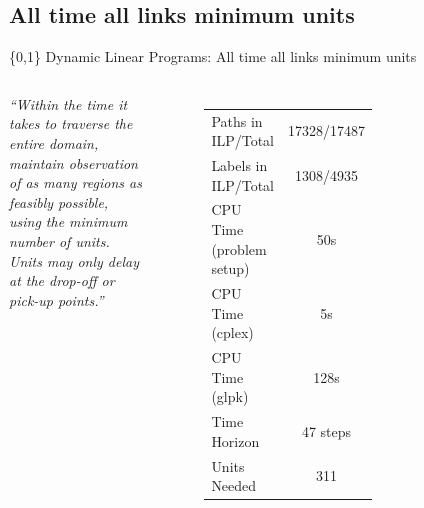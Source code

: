 \documentclass[xcolor=pdflatex,dvipsnames,table]{beamer}
\begin{document}
\subsection{All time all links minimum units}
\begin{frame}{\{0,1\} Dynamic Linear Programs: All time all links minimum units}
\begin{columns}

  \emph{``Within the time it takes to traverse the entire domain, maintain observation of as many regions as feasibly possible, using the minimum number of units. Units may only delay at the drop-off or pick-up points.''}
  \begin{figure}
    \begin{tabular}{|l|c|}
    \hline 
    Paths in ILP/Total & 17328/17487 \\
    Labels in ILP/Total & 1308/4935 \\
    CPU Time (problem setup) & 50s \\
    CPU Time (cplex) & 5s \\
    CPU Time (glpk) & 128s \\
    Time Horizon & 47 steps\\
    Units Needed & 311 \\
    \hline
    \end{tabular}
  \end{figure}


  \begin{figure}
    \centering
    \hfill
  \end{figure}

\end{columns}
\end{frame}

\end{document}

